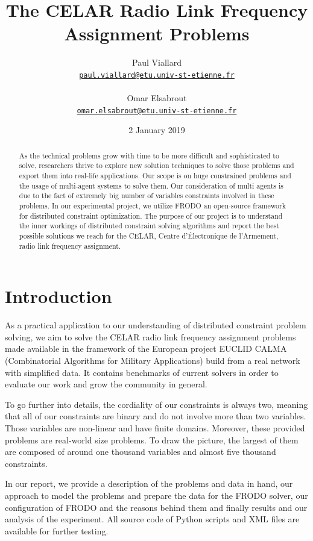\documentclass{article}
\title{The CELAR Radio Link Frequency Assignment Problems}
\author{Paul Viallard\\
	\texttt{\href{mailto:paul.viallard@etu.univ-st-etienne.fr}{paul.viallard@etu.univ-st-etienne.fr}} 
	\\\\ Omar Elsabrout\\
	\texttt{\href{mailto:omar.elsabrout@etu.univ-st-etienne.fr}{omar.elsabrout@etu.univ-st-etienne.fr}}}
\date{2 January 2019}
\begin{document}
	\maketitle
	
	\begin{abstract}
		As the technical problems grow with time to be more difficult and sophisticated to solve, researchers thrive to explore new solution techniques to solve those problems and export them into real-life applications. Our scope is on huge constrained problems and the usage of multi-agent systems to solve them. Our consideration of multi agents is due to the fact of extremely big number of variables constraints involved in these problems. In our experimental project, we utilize FRODO\cite{FRODO} an open-source framework for distributed constraint optimization. The purpose of our project is to understand the inner workings of distributed constraint solving algorithms and report the best possible solutions we reach for the CELAR, Centre d’Électronique de l’Armement, radio link frequency assignment.
	\end{abstract}
	
	\section{Introduction}
	As a practical application to our understanding of distributed constraint problem solving, we aim to solve the CELAR radio link frequency assignment problems made available in the framework of the European project EUCLID CALMA (Combinatorial Algorithms for Military Applications) build from a real network with simplified data. It contains benchmarks of current solvers in order to evaluate our work and grow the community in general.
	
	To go further into details, the cordiality of our constraints is always two, meaning that all of our constraints are binary and do not involve more than two variables. Those variables are non-linear and have finite domains. Moreover, these provided problems are real-world size problems. To draw the picture, the largest of them are composed of around one thousand variables and almost five thousand constraints.
	
	In our report, we provide a description of the problems and data in hand, our approach to model the problems and prepare the data for the FRODO solver, our configuration of FRODO and the reasons behind them and finally results and our analysis of the experiment. All source code of Python scripts and XML files are available for further testing.
	
\end{document}
